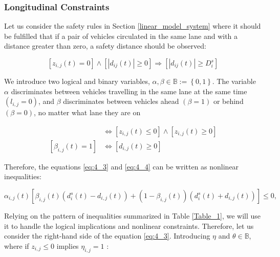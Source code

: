 \subsubsection{Longitudinal Constraints}




Let us consider the safety rules in Section \ref{linear_model_system} where it should be fulfilled that if a pair of vehicles circulated in the same lane and with a distance greater than zero, a safety distance should be observed: 


\begin{equation}
 [z_{i,j}(t)=0] \wedge [\left | d_{ij}(t) \right | \geq 0] \Rightarrow [\left | d_{ij}(t) \right | \geq D_i^s]
\end{equation}

We introduce two logical and binary variables, $\alpha ,\beta \in \mathbb{B} := \left\{ 0,1 \right\}$. The variable $\alpha$ discriminates between vehicles travelling in the same lane at the same time $(l_{i,j}=0)$, and $\beta$ discriminates between vehicles ahead $(\beta=1)$ or behind $(\beta=0)$, no matter what lane they are on

\begin{align}
 [\alpha_{i,j}(t) = 1] & \Leftrightarrow [z_{i,j}(t) \leq 0] \wedge [z_{i,j}(t) \geq 0]
 \label{eq:4_3}
 \\
 [\beta_{i,j}(t) = 1] & \Leftrightarrow  [d_{i,j}(t) \geq 0]
 \label{eq:4_4}
\end{align}



Therefore, the equations \ref{eq:4_3} and \ref{eq:4_4} can be written as nonlinear inequalities:

\begin{equation}
    \alpha _{i,j}(t)[\beta_{i,j}(t)(d^s_i(t)-d_{i,j}(t)) + (1-\beta_{i,j}(t))(d^s_i(t)+d_{i,j}(t) )] \leq 0,
    \label{eq:4_5}
\end{equation}

Relying on the pattern of inequalities summarized in Table \ref{Table_1}, we will use it to handle the logical implications and nonlinear constraints. Therefore, let us consider the right-hand side of the equation \ref{eq:4_3}. Introducing $\eta$ and $\theta \in \mathbb{B}$, where if $z_{i,j} \leq 0$  implies $\eta_{i,j} = 1$  :


